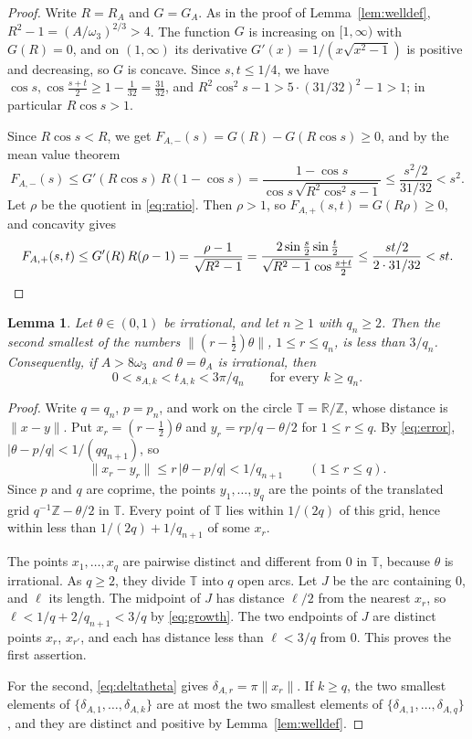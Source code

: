 \documentclass{amsart}
\newtheorem{lemma}[theorem]{Lemma}
\theoremstyle{definition}
\theoremstyle{remark}
\numberwithin{equation}{section}
\newcommand{\R}{\mathbb{R}}
\newcommand{\Z}{\mathbb{Z}}
\newcommand{\T}{\mathbb{T}}
\newcommand{\norm}[1]{\lVert #1 \rVert}
\begin{document}
\begin{proof}
Write $R=R_A$ and $G=G_A$. As in the proof of Lemma~\ref{lem:welldef}, $R^2-1=(A/\omega_3)^{2/3}>4$. The function $G$ is increasing on $[1,\infty)$ with $G(R)=0$, and on $(1,\infty)$ its derivative $G'(x)=1/(x\sqrt{x^2-1})$ is positive and decreasing, so $G$ is concave. Since $s,t\le1/4$, we have $\cos s,\cos\frac{s+t}2\ge1-\frac1{32}=\frac{31}{32}$, and $R^2\cos^2s-1>5\cdot(31/32)^2-1>1$; in particular $R\cos s>1$.

Since $R\cos s<R$, we get $F_{A,-}(s)=G(R)-G(R\cos s)\ge0$, and by the mean value theorem
\[
F_{A,-}(s)\le G'(R\cos s)\,R(1-\cos s)=\frac{1-\cos s}{\cos s\,\sqrt{R^2\cos^2s-1}}\le\frac{s^2/2}{31/32}<s^2 .
\]
Let $\rho$ be the quotient in \eqref{eq:ratio}. Then $\rho>1$, so $F_{A,+}(s,t)=G(R\rho)\ge0$, and concavity gives
\[
F_{A,+}(s,t)\le G'(R)\,R(\rho-1)=\frac{\rho-1}{\sqrt{R^2-1}}
=\frac{2\sin\frac s2\sin\frac t2}{\sqrt{R^2-1}\,\cos\frac{s+t}2}\le\frac{st/2}{2\cdot31/32}<st. \qedhere
\]
\end{proof}

\begin{lemma}\label{lem:second}
Let $\theta\in(0,1)$ be irrational, and let $n\ge1$ with $q_n\ge2$. Then the second smallest of the numbers $\norm{(r-\frac12)\theta}$, $1\le r\le q_n$, is less than $3/q_n$. Consequently, if $A>8\omega_3$ and $\theta=\theta_A$ is irrational, then
\[
0<s_{A,k}<t_{A,k}<3\pi/q_n\qquad\text{for every }k\ge q_n .
\]
\end{lemma}

\begin{proof}
Write $q=q_n$, $p=p_n$, and work on the circle $\T=\R/\Z$, whose distance is $\norm{x-y}$. Put $x_r=(r-\frac12)\theta$ and $y_r=rp/q-\theta/2$ for $1\le r\le q$. By \eqref{eq:error}, $\lvert\theta-p/q\rvert<1/(qq_{n+1})$, so
\[
\norm{x_r-y_r}\le r\,\lvert\theta-p/q\rvert<1/q_{n+1}\qquad(1\le r\le q).
\]
Since $p$ and $q$ are coprime, the points $y_1,\dots,y_q$ are the points of the translated grid $q^{-1}\Z-\theta/2$ in $\T$. Every point of $\T$ lies within $1/(2q)$ of this grid, hence within less than $1/(2q)+1/q_{n+1}$ of some $x_r$.

The points $x_1,\dots,x_q$ are pairwise distinct and different from $0$ in $\T$, because $\theta$ is irrational. As $q\ge2$, they divide $\T$ into $q$ open arcs. Let $J$ be the arc containing $0$, and $\ell$ its length. The midpoint of $J$ has distance $\ell/2$ from the nearest $x_r$, so $\ell<1/q+2/q_{n+1}<3/q$ by \eqref{eq:growth}. The two endpoints of $J$ are distinct points $x_r$, $x_{r'}$, and each has distance less than $\ell<3/q$ from $0$. This proves the first assertion.

For the second, \eqref{eq:deltatheta} gives $\delta_{A,r}=\pi\norm{x_r}$. If $k\ge q$, the two smallest elements of $\{\delta_{A,1},\dots,\delta_{A,k}\}$ are at most the two smallest elements of $\{\delta_{A,1},\dots,\delta_{A,q}\}$, and they are distinct and positive by Lemma~\ref{lem:welldef}.
\end{proof}
\end{document}
